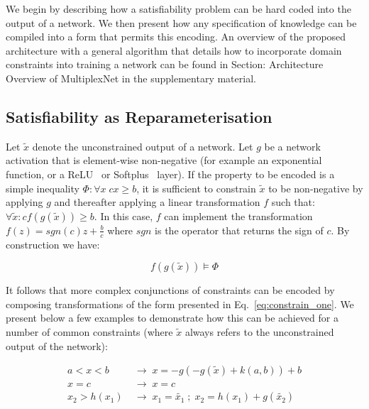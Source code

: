\documentclass[letterpaper]{article} %
\begin{document}
We begin by describing how a satisfiability problem can be hard coded into the output of a network.
We then present how any specification of knowledge can be compiled into a form that permits this encoding.
An overview of the proposed architecture with a general algorithm that details how to incorporate domain constraints into training a network can be found in Section: Architecture Overview of MultiplexNet in the supplementary material.

\subsection{Satisfiability as Reparameterisation}
\label{sec:sat_as_reparam}

Let $\tilde{x}$ denote the unconstrained output of a network.
Let $g$ be a network activation that is element-wise non-negative (for example an exponential function, or a ReLU~\citep{nair2010rectified} or Softplus~\citep{dugas2001incorporating} layer).
If the property to be encoded is a simple inequality $\Phi: \forall x \; c x \geq b$, it is sufficient to constrain $\tilde{x}$ to be non-negative by applying $g$ and thereafter applying a linear transformation $f$ such that:
$\forall \tilde{x}: c f(g(\tilde{x})) \geq b$.
In this case, ${f}$ can implement the transformation $f(z) = sgn(c)z + \frac{b}{c}$ where $sgn$ is the operator that returns the sign of $c$.
By construction we have:

\begin{equation}
    \label{eq:constrain_one}
        f(g(\tilde{x})) \models \Phi
\end{equation}

It follows that more complex conjunctions of constraints can be encoded by composing transformations of the form presented in Eq.~\ref{eq:constrain_one}.
We present below a few examples to demonstrate how this can be achieved for a number of common constraints (where $\tilde{x}$ always refers to the unconstrained output of the network):

\begin{align}
    \label{eq:common_operations_line1}
    a < x < b \; &\rightarrow \; x = -g(-g(\tilde{x}) + k(a, b)) + b \\
    \label{eq:common_operations_line2}
    x = c \; &\rightarrow \; x = c \\
    \label{eq:common_operations_line3}
    x_2 > h(x_1) \; &\rightarrow \; x_1 = \tilde{x_1} \; ; \; x_2 = h(x_1) + g(\tilde{x_2})
\end{align}
\end{document}
